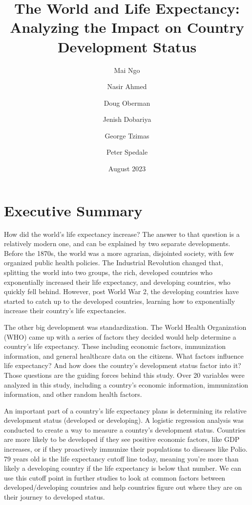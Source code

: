 \documentclass[12pt]{article}
\title{The World and Life Expectancy: Analyzing the Impact on Country Development Status}
\author{Mai Ngo \and Nasir Ahmed \and Doug Oberman \and Jenish Dobariya \and George Tzimas \and Peter Spedale}
\date{August 2023}
\begin{document}
\maketitle

\vskip 30pt
\section{Executive Summary}
How did the world’s life expectancy increase? The answer to that question is a relatively modern one, and can be explained by two separate developments. Before the 1870s, the world was a more agrarian, disjointed society, with few organized public health policies. The Industrial Revolution changed that, splitting the world into two groups, the rich, developed countries who exponentially increased their life expectancy, and developing countries, who quickly fell behind. However, post World War 2, the developing countries have started to catch up to the developed countries, learning how to exponentially increase their country’s life expectancies.

The other big development was standardization. The World Health Organization (WHO) came up with a series of factors they decided would help determine a country’s life expectancy. These including economic factors, immunization information, and general healthcare data on the citizens. What factors influence life expectancy? And how does the country’s development status factor into it? Those questions are the guiding forces behind this study. Over 20 variables were analyzed in this study, including a country’s economic information, immunization information, and other random health factors.

An important part of a country’s life expectancy plans is determining its relative development status (developed or developing). A logistic regression analysis was conducted to create a way to measure a country’s development status. Countries are more likely to be developed if they see positive economic factors, like GDP increases, or if they proactively immunize their populations to diseases like Polio. 79 years old is the life expectancy cutoff line today, meaning you’re more than likely a developing country if the life expectancy is below that number. We can use this cutoff point in further studies to look at common factors between developed/developing countries and help countries figure out where they are on their journey to developed status.
\end{document}

